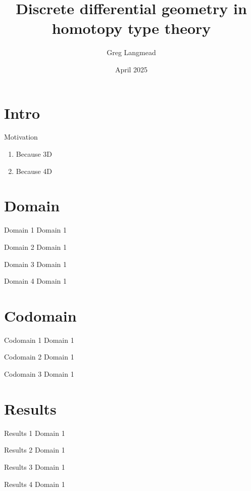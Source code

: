 \documentclass[14pt,aspectratio=169]{beamer}
\title[Geometry in HoTT]{Discrete differential geometry in homotopy type theory}
\author{Greg Langmead}
\institute[CMU]{Carnegie Mellon University}
\date{April 2025}
\begin{document}
\maketitle
\section{Intro}
\begin{frame}{Motivation}
\begin{enumerate}
\item<1-> Because 3D
\item<2-> Because 4D
\end{enumerate}
\end{frame}
\section{Domain}
\begin{frame}{Domain 1}
Domain 1\end{frame}
\begin{frame}{Domain 2}
Domain 1\end{frame}
\begin{frame}{Domain 3}
Domain 1\end{frame}
\begin{frame}{Domain 4}
Domain 1\end{frame}
\section{Codomain}
\begin{frame}{Codomain 1}
Domain 1\end{frame}
\begin{frame}{Codomain 2}
Domain 1\end{frame}
\begin{frame}{Codomain 3}
Domain 1\end{frame}

\section{Results}
\begin{frame}{Results 1}
Domain 1\end{frame}
\begin{frame}{Results 2}
Domain 1\end{frame}
\begin{frame}{Results 3}
Domain 1\end{frame}
\begin{frame}{Results 4}
Domain 1\end{frame}
\end{document}
